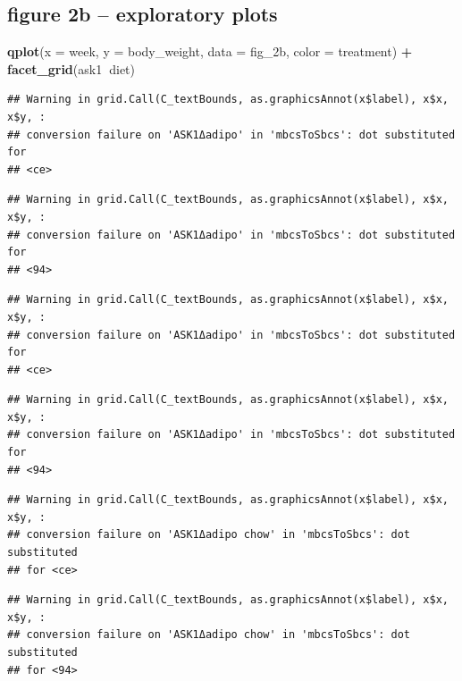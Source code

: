 \documentclass[]{book}
\newenvironment{Shaded}{\begin{snugshade}}{\end{snugshade}}
\newcommand{\DataTypeTok}[1]{\textcolor[rgb]{0.13,0.29,0.53}{#1}}
\newcommand{\KeywordTok}[1]{\textcolor[rgb]{0.13,0.29,0.53}{\textbf{#1}}}
\newcommand{\NormalTok}[1]{#1}
\newcommand{\OperatorTok}[1]{\textcolor[rgb]{0.81,0.36,0.00}{\textbf{#1}}}
\newcommand{\StringTok}[1]{\textcolor[rgb]{0.31,0.60,0.02}{#1}}
\begin{document}
\hypertarget{figure-2b-exploratory-plots}{%
\subsection{figure 2b -- exploratory plots}\label{figure-2b-exploratory-plots}}

\begin{Shaded}
\begin{Highlighting}[]
\KeywordTok{qplot}\NormalTok{(}\DataTypeTok{x =}\NormalTok{ week,}
      \DataTypeTok{y =}\NormalTok{ body_weight,}
      \DataTypeTok{data =}\NormalTok{ fig_2b,}
      \DataTypeTok{color =}\NormalTok{ treatment) }\OperatorTok{+}
\StringTok{  }\KeywordTok{facet_grid}\NormalTok{(ask1}\OperatorTok{~}\NormalTok{diet)}
\end{Highlighting}
\end{Shaded}

\begin{verbatim}
## Warning in grid.Call(C_textBounds, as.graphicsAnnot(x$label), x$x, x$y, :
## conversion failure on 'ASK1Δadipo' in 'mbcsToSbcs': dot substituted for
## <ce>
\end{verbatim}

\begin{verbatim}
## Warning in grid.Call(C_textBounds, as.graphicsAnnot(x$label), x$x, x$y, :
## conversion failure on 'ASK1Δadipo' in 'mbcsToSbcs': dot substituted for
## <94>
\end{verbatim}

\begin{verbatim}
## Warning in grid.Call(C_textBounds, as.graphicsAnnot(x$label), x$x, x$y, :
## conversion failure on 'ASK1Δadipo' in 'mbcsToSbcs': dot substituted for
## <ce>
\end{verbatim}

\begin{verbatim}
## Warning in grid.Call(C_textBounds, as.graphicsAnnot(x$label), x$x, x$y, :
## conversion failure on 'ASK1Δadipo' in 'mbcsToSbcs': dot substituted for
## <94>
\end{verbatim}

\begin{verbatim}
## Warning in grid.Call(C_textBounds, as.graphicsAnnot(x$label), x$x, x$y, :
## conversion failure on 'ASK1Δadipo chow' in 'mbcsToSbcs': dot substituted
## for <ce>
\end{verbatim}

\begin{verbatim}
## Warning in grid.Call(C_textBounds, as.graphicsAnnot(x$label), x$x, x$y, :
## conversion failure on 'ASK1Δadipo chow' in 'mbcsToSbcs': dot substituted
## for <94>
\end{verbatim}
\end{document}
